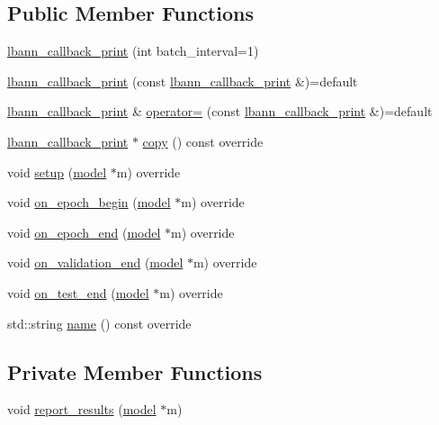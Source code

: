 \subsection*{Public Member Functions}
\begin{DoxyCompactItemize}
\item 
\hyperlink{classlbann_1_1lbann__callback__print_ac31f404ac68a2cb24cd3d544d128f1d9}{lbann\+\_\+callback\+\_\+print} (int batch\+\_\+interval=1)
\item 
\hyperlink{classlbann_1_1lbann__callback__print_aca5b4f8a44d6194a31c08aabc59c9748}{lbann\+\_\+callback\+\_\+print} (const \hyperlink{classlbann_1_1lbann__callback__print}{lbann\+\_\+callback\+\_\+print} \&)=default
\item 
\hyperlink{classlbann_1_1lbann__callback__print}{lbann\+\_\+callback\+\_\+print} \& \hyperlink{classlbann_1_1lbann__callback__print_a4924cd2aebecdca00dbc0ac9d71df666}{operator=} (const \hyperlink{classlbann_1_1lbann__callback__print}{lbann\+\_\+callback\+\_\+print} \&)=default
\item 
\hyperlink{classlbann_1_1lbann__callback__print}{lbann\+\_\+callback\+\_\+print} $\ast$ \hyperlink{classlbann_1_1lbann__callback__print_aa75e076c3d840a2186825be2e8dbac8c}{copy} () const override
\item 
void \hyperlink{classlbann_1_1lbann__callback__print_a405e20e9fa137bd377faf692cc3c54aa}{setup} (\hyperlink{classlbann_1_1model}{model} $\ast$m) override
\item 
void \hyperlink{classlbann_1_1lbann__callback__print_ae3c99d7c56ac33ab7e09880134b43cad}{on\+\_\+epoch\+\_\+begin} (\hyperlink{classlbann_1_1model}{model} $\ast$m) override
\item 
void \hyperlink{classlbann_1_1lbann__callback__print_a28f2b022193c62f3af40364d2c5b14b2}{on\+\_\+epoch\+\_\+end} (\hyperlink{classlbann_1_1model}{model} $\ast$m) override
\item 
void \hyperlink{classlbann_1_1lbann__callback__print_a7090572e2f89e7994872b5fdb612dd3f}{on\+\_\+validation\+\_\+end} (\hyperlink{classlbann_1_1model}{model} $\ast$m) override
\item 
void \hyperlink{classlbann_1_1lbann__callback__print_a1f72a486004af859823f75c311dcff42}{on\+\_\+test\+\_\+end} (\hyperlink{classlbann_1_1model}{model} $\ast$m) override
\item 
std\+::string \hyperlink{classlbann_1_1lbann__callback__print_a212640539d73eec3317572150a11b71b}{name} () const override
\end{DoxyCompactItemize}
\subsection*{Private Member Functions}
\begin{DoxyCompactItemize}
\item 
void \hyperlink{classlbann_1_1lbann__callback__print_a50117faa3edb961ddd87c5c5806820b2}{report\+\_\+results} (\hyperlink{classlbann_1_1model}{model} $\ast$m)
\end{DoxyCompactItemize}
